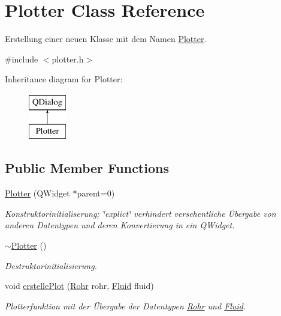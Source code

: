 \hypertarget{class_plotter}{}\section{Plotter Class Reference}
\label{class_plotter}


Erstellung einer neuen Klasse mit dem Namen \hyperlink{class_plotter}{Plotter}.  




{\ttfamily \#include $<$plotter.\+h$>$}

Inheritance diagram for Plotter\+:\begin{figure}[H]
\begin{center}
\leavevmode
\includegraphics[height=2.000000cm]{class_plotter}
\end{center}
\end{figure}
\subsection*{Public Member Functions}
\begin{DoxyCompactItemize}
\item 
\hyperlink{class_plotter_a367b6890c36910a27ec710ac3693e64b}{Plotter} (Q\+Widget $\ast$parent=0)
\begin{DoxyCompactList}\small\item\em Konstruktorinitialiserung; \char`\"{}explict\char`\"{} verhindert versehentliche Übergabe von anderen Datentypen und deren Konvertierung in ein Q\+Widget. \end{DoxyCompactList}\item 
\hyperlink{class_plotter_acd0883f9597a6b3bfcca0fce926809a0}{$\sim$\+Plotter} ()
\begin{DoxyCompactList}\small\item\em Destruktorinitialisierung. \end{DoxyCompactList}\item 
void \hyperlink{class_plotter_a7169eca3c8b2e1a270dbf720af572410}{erstelle\+Plot} (\hyperlink{class_rohr}{Rohr} rohr, \hyperlink{class_fluid}{Fluid} fluid)
\begin{DoxyCompactList}\small\item\em Plotterfunktion mit der Übergabe der Datentypen \hyperlink{class_rohr}{Rohr} und \hyperlink{class_fluid}{Fluid}. \end{DoxyCompactList}\end{DoxyCompactItemize}


